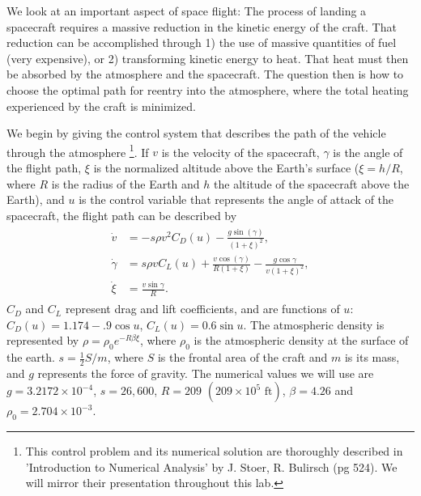 \label{lab:reentry}


We look at an important aspect of space flight: The process of landing a spacecraft requires a massive reduction in the kinetic energy of the craft. That reduction can be accomplished through 1) the use of massive quantities of fuel (very expensive), or 2) transforming kinetic energy to heat. That heat must then be absorbed by the atmosphere and the spacecraft. The question then is how to choose the optimal path for reentry into the atmosphere, where the total heating experienced by the craft is minimized. 

We begin by giving the control system that describes the path of the vehicle through the atmosphere
\footnote{This control problem and its numerical solution are thoroughly described in 'Introduction to Numerical Analysis' by J. Stoer, R. Bulirsch (pg 524). 
We will mirror their presentation throughout this lab.}. 
If $v$ is the velocity of the spacecraft, $\gamma$ is the angle of the flight path, $\xi$ is the normalized altitude above the Earth's surface ($\xi = h/R$, where $R$ is the radius of the Earth and $h$ the altitude of the spacecraft above the Earth), and $u$ is the control variable that represents the angle of attack of the spacecraft, the flight path can be described by 
\begin{align}
\begin{split}
\dot{v} &= -s\rho v^2C_D(u) - \frac{g\sin(\gamma)}{(1+\xi)^2},\\
\dot{\gamma} &= s \rho v C_L(u) + \frac{v \cos(\gamma)}{R(1+\xi)} - \frac{g \cos \gamma}{v(1+\xi)^2},\\
\dot{\xi} &= \frac{v \sin \gamma}{R}.
\end{split} \label{eqn:reentry:control_system}
\end{align}
$C_D$ and $C_L$ represent drag and lift coefficients, and are functions of $u$: $C_D(u) = 1.174 - .9\cos u$, $C_L(u) = 0.6\sin u$. 
The atmospheric density is represented by $\rho = \rho_0e^{-R\beta\xi}$, where  $\rho_0$ is the atmospheric density at the surface of the earth. 
$s = \frac{1}{2}S/m$, where $S$ is the frontal area of the craft and $m$ is its mass, and $g$ represents the force of gravity. 
The numerical values we will use are $g = 3.2172\times10^{-4}$, $s = 26,600$, $R = 209$ $(209\times 10^5 \text{ ft})$, $\beta = 4.26$ and $\rho_0 = 2.704\times 10^{-3}$. 


